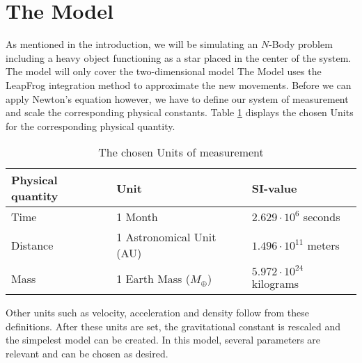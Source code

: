 \section{The Model}
As mentioned in the introduction, we will be simulating an \(N\)-Body problem including a heavy  object functioning as a star placed in the center of the system. The model will only cover the two-dimensional model 
The Model uses the LeapFrog integration method to approximate the new movements. 
Before we can apply Newton's equation however, we have to define our system of measurement and scale the corresponding physical constants.
Table \ref{tab:eenheden} displays the chosen Units for the corresponding physical quantity.

\begin{table}[h!]
\centering
\caption{The chosen Units of measurement}
\label{tab:eenheden}
\begin{tabular}{l|l|l}
  Physical quantity & Unit & SI-value \\ \hline
Time & 1 Month & \(2.629\cdot 10^{6}\) seconds  \\ 
 Distance & 1 Astronomical Unit (AU) & \(1.496\cdot10^{11}\) meters   \\
 Mass & 1 Earth Mass (\(M_\oplus\))& \(5.972\cdot10^{24}\) kilograms \\
\end{tabular}
\end{table}
Other units such as velocity, acceleration and density follow from these definitions. After these units are set, the gravitational constant is rescaled and the simpelest model can be created.
In this model, several parameters are relevant and can be chosen as desired. 
